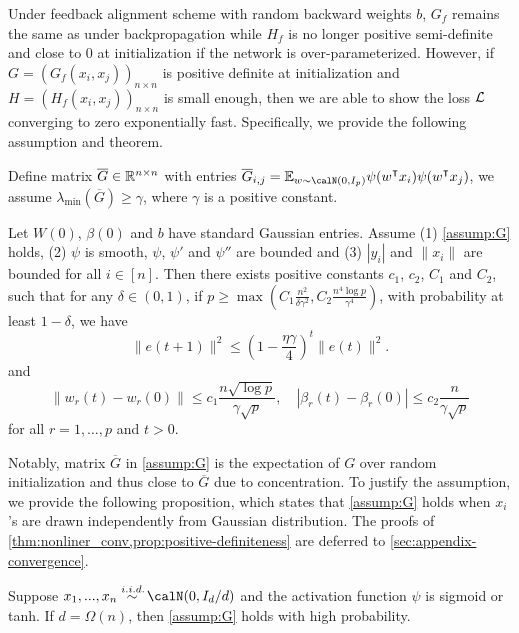 Under feedback alignment scheme with random backward weights $b$, $G_f$ remains the same as under backpropagation while $H_f$ is no longer positive semi-definite and close to $0$ at initialization if the network is over-parameterized. However, if $G = (G_f(x_i,x_j))_{n\times n}$ is positive definite at initialization and $H = (H_f(x_i,x_j))_{n\times n}$ is small enough, then we are able to show the loss $\mathcal{L}$ converging to zero exponentially fast. Specifically, we provide the following assumption and theorem.

\begin{assumption}\label{assump:G}
Define matrix $\overline{G} \in \mathbb{R}^{n\times n}$ with entries
$\overline{G}_{i,j} = \E_{w\sim \calN(0,I_p)}\psi(w\transpose x_i) \psi(w\transpose  x_j)$, we assume $\lambda_{\min}(\overline{G}) \geq \gamma$, where $\gamma$ is a positive constant.
\end{assumption}

\begin{theorem}\label{thm:nonliner_conv}
Let $W(0)$, $\beta(0)$ and $b$ have \iid standard Gaussian entries. Assume \textnormal{(1)} \cref{assump:G} holds, \textnormal{(2)} $\psi$ is smooth, $\psi$, $\psi'$ and $\psi''$ are bounded and \textnormal{(3)} $|y_i|$ and $\|x_i\|$ are bounded for all $i\in[n]$. Then there exists positive constants $c_1$, $c_2$, $C_1$ and $C_2$, such that for any $\delta\in(0,1)$, if $p \geq \max(C_1\frac{n^2}{\delta\gamma^2}, C_2\frac{n^4\log p}{\gamma^4})$, with probability at least $1-\delta$, we have
\begin{equation}\label{eq:conv}
    \|e(t+1)\|^2 \leq (1-\frac{\eta\gamma}{4})^t\|e(t)\|^2.
\end{equation}
and 
\begin{equation}
\label{eq:weights}
    \|w_r(t)-w_r(0)\| \leq c_1\frac{n\sqrt{\log p}}{\gamma\sqrt p}, \quad |\beta_r(t)-\beta_r(0)| \leq c_2\frac{n}{\gamma\sqrt p}
\end{equation}
for all $r=1,\ldots, p$ and $t>0$.
\end{theorem}

Notably, matrix $\overline{G}$ in \cref{assump:G} is the expectation of $G$ over random initialization and thus close to $\overline{G}$ due to concentration. To justify the assumption, we provide the following proposition, which states that \cref{assump:G} holds when $x_i$'s are drawn independently from Gaussian distribution. The proofs of \cref{thm:nonliner_conv,prop:positive-definiteness} are deferred to \cref{sec:appendix-convergence}.

\begin{proposition}\label{prop:positive-definiteness}
Suppose $x_1,...,x_n \overset{\iid}{\sim} \calN(0,I_d/d)$ and the activation function $\psi$ is sigmoid or tanh. If $d=\Omega(n)$, then \cref{assump:G} holds with high probability.
\end{proposition}




